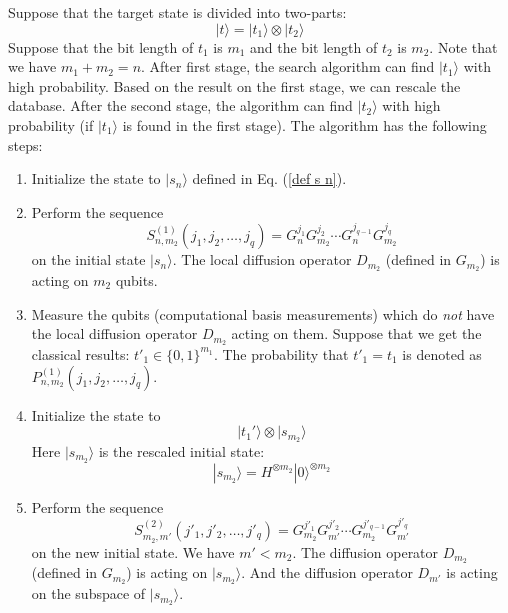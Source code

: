 \documentclass[%
 twocolumn,
 10pt,
 superscriptaddress,
 longbibliography,
 amsmath,amssymb,
 aps,
 pra,
floatfix,
]{revtex4-1}
\begin{document}
Suppose that the target state is divided into two-parts:
\begin{equation}
\label{eqa t t1}
    |t\rangle=|t_1\rangle\otimes|t_2\rangle
\end{equation}
Suppose that the bit length of $t_1$ is $m_1$ and the bit length of $t_2$ is $m_2$. Note that we have $m_1+m_2=n$. After first stage, the search algorithm can find $|t_1\rangle$ with high probability. Based on the result on the first stage, we can rescale the database. After the second stage, the algorithm can find $|t_2\rangle$ with high probability (if $|t_1\rangle$ is found in the first stage). The algorithm has the following steps: 

\begin{enumerate}[Step 1:]
    
    \item Initialize the state to $|s_n\rangle$ defined in Eq. (\ref{def s n}).
    
    \item Perform the sequence  
        \begin{equation}
            S^{(1)}_{n,m_2}(j_1,j_2,\ldots,j_q) = G_n^{j_1}G_{m_2}^{j_{2}}\cdots G_n^{j_{q-1}}G_{m_2}^{j_q}
        \end{equation}
    on the initial state $|s_n\rangle$. The local diffusion operator $D_{m_2}$ (defined in $G_{m_2}$) is acting on $m_2$ qubits. 
    
    \item Measure the qubits (computational basis measurements) which do \textit{not} have the local diffusion operator $D_{m_2}$ acting on them. Suppose that we get the classical results: $t'_1\in\{0,1\}^{m_1}$. The probability that $t'_1=t_1$ is denoted as $P^{(1)}_{n,m_2}(j_1,j_2,\ldots,j_q)$.
    
    \item Initialize the state to
        $$ |t_1'\rangle\otimes|s_{m_2}\rangle
        $$
        Here $|s_{m_2}\rangle$ is the rescaled initial state:
        \begin{equation}
            |s_{m_2}\rangle = H^{\otimes m_2}|0\rangle^{\otimes m_2}
        \end{equation}
        
    \item Perform the sequence  
        \begin{equation}
            S^{(2)}_{m_2,m'}(j'_1,j'_2,\ldots,j'_q) = G_{m_2}^{j'_1}G_{m'}^{j'_2}\cdots G_{m_2}^{j'_{q-1}}G_{m'}^{j'_q}
        \end{equation}
    on the new initial state. We have $m'<m_2$. The diffusion operator $D_{m_2}$ (defined in $G_{m_2}$) is acting on $|s_{m_2}\rangle$. And the diffusion operator $D_{m'}$ is acting on the subspace of $|s_{m_2}\rangle$.
    

\end{enumerate}
\end{document}

